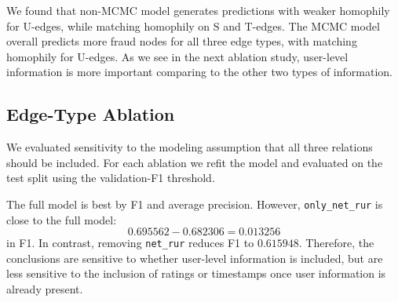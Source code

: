 \documentclass[10pt,reqno]{amsart}
\begin{document}
We found that non-MCMC model generates predictions with weaker homophily for U-edges, while matching homophily on S and T-edges. The MCMC model overall predicts more fraud nodes for all three edge types, with matching homophily for U-edges. As we see in the next ablation study, user-level information is more important comparing to the other two types of information.

\subsection{Edge-Type Ablation}
We evaluated sensitivity to the modeling assumption that all three relations
should be included. For each ablation we refit the model and evaluated on the
test split using the validation-F1 threshold.

\begin{table}[h]
\centering
\caption{Edge-type ablation results.}
\vspace{-0.35em}
\end{table}

The full model is best by F1 and average precision. However,
\texttt{only\_net\_rur} is close to the full model:
\[
    0.695562-0.682306=0.013256
\]
in F1. In contrast, removing \texttt{net\_rur} reduces F1 to $0.615948$.
Therefore, the conclusions are sensitive to whether user-level information is included, but are less sensitive to the inclusion of ratings or timestamps once user information is already present.
\end{document}
